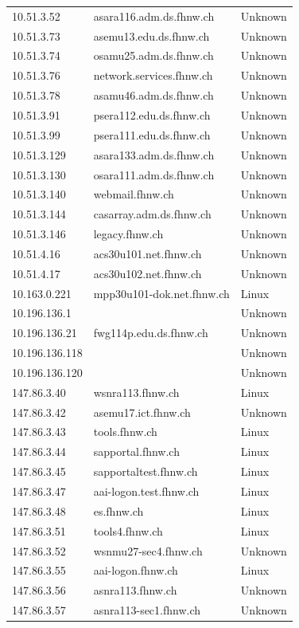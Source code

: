 \documentclass[11pt,a4paper]{scrartcl}
\begin{document}
\begin{longtable}{p{2.5cm}|p{8cm}|l}
	10.51.3.52 & asara116.adm.ds.fhnw.ch & Unknown\\
	10.51.3.73 & asemu13.edu.ds.fhnw.ch & Unknown\\
	10.51.3.74 & osamu25.adm.ds.fhnw.ch & Unknown\\
	10.51.3.76 & network.services.fhnw.ch & Unknown\\
	10.51.3.78 & asamu46.adm.ds.fhnw.ch & Unknown\\
	10.51.3.91 & psera112.edu.ds.fhnw.ch & Unknown\\
	10.51.3.99 & psera111.edu.ds.fhnw.ch & Unknown\\
	10.51.3.129 & asara133.adm.ds.fhnw.ch & Unknown\\
	10.51.3.130 & osara111.adm.ds.fhnw.ch & Unknown\\
	10.51.3.140 & webmail.fhnw.ch & Unknown\\
	10.51.3.144 & casarray.adm.ds.fhnw.ch & Unknown\\
	10.51.3.146 & legacy.fhnw.ch & Unknown\\
	10.51.4.16 & acs30u101.net.fhnw.ch & Unknown\\
	10.51.4.17 & acs30u102.net.fhnw.ch & Unknown\\
	10.163.0.221 & mpp30u101-dok.net.fhnw.ch & Linux\\
	10.196.136.1 &  & Unknown\\
	10.196.136.21 & fwg114p.edu.ds.fhnw.ch & Unknown\\
	10.196.136.118 &  & Unknown\\
	10.196.136.120 &  & Unknown\\
	147.86.3.40 & wsnra113.fhnw.ch & Linux\\
	147.86.3.42 & asemu17.ict.fhnw.ch & Unknown\\
	147.86.3.43 & tools.fhnw.ch & Linux\\
	147.86.3.44 & sapportal.fhnw.ch & Linux\\
	147.86.3.45 & sapportaltest.fhnw.ch & Linux\\
	147.86.3.47 & aai-logon.test.fhnw.ch & Linux\\
	147.86.3.48 & es.fhnw.ch & Linux\\
	147.86.3.51 & tools4.fhnw.ch & Linux\\
	147.86.3.52 & wsnmu27-sec4.fhnw.ch & Unknown\\
	147.86.3.55 & aai-logon.fhnw.ch & Linux\\
	147.86.3.56 & asnra113.fhnw.ch & Unknown\\
	147.86.3.57 & asnra113-sec1.fhnw.ch & Unknown\\

\end{longtable}
\end{document}
